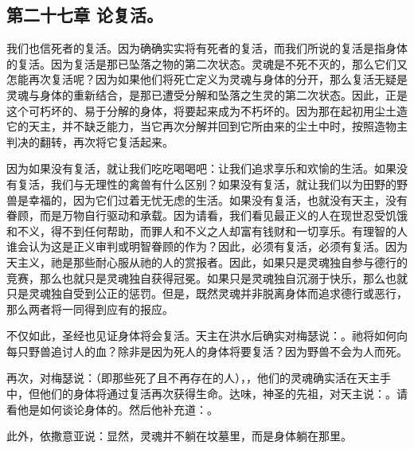 
\subsection{第二十七章 论复活。}

我们也信死者的复活。因为确确实实将有死者的复活，而我们所说的复活是指身体的复活。因为复活是那已坠落之物的第二次状态。灵魂是不死不灭的，那么它们又怎能再次复活呢？因为如果他们将死亡定义为灵魂与身体的分开，那么复活无疑是灵魂与身体的重新结合，是那已遭受分解和坠落之生灵的第二次状态。因此，正是这个可朽坏的、易于分解的身体，将要起来成为不朽坏的。因为那在起初用尘土造它的天主，并不缺乏能力，当它再次分解并回到它所由来的尘土中时，按照造物主判决的翻转，再次将它复活起来。\par

因为如果没有复活，就让我们吃吃喝喝吧：让我们追求享乐和欢愉的生活。如果没有复活，我们与无理性的禽兽有什么区别？如果没有复活，就让我们以为田野的野兽是幸福的，因为它们过着无忧无虑的生活。如果没有复活，也就没有天主，没有眷顾，而是万物自行驱动和承载。因为请看，我们看见最正义的人在现世忍受饥饿和不义，得不到任何帮助，而罪人和不义之人却富有钱财和一切享乐。有理智的人谁会认为这是正义审判或明智眷顾的作为？因此，必须有复活，必须有复活。因为天主义，祂是那些耐心服从祂的人的赏报者。因此，如果只是灵魂独自参与德行的竞赛，那么也就只是灵魂独自获得冠冕。如果只是灵魂独自沉溺于快乐，那么也就只是灵魂独自受到公正的惩罚。但是，既然灵魂并非脱离身体而追求德行或恶行，那么两者将一同得到应有的报应。\par

不仅如此，圣经也见证身体将会复活。天主在洪水后确实对梅瑟说：。祂将如何向每只野兽追讨人的血？除非是因为死人的身体将要复活？因为野兽不会为人而死。\par

再次，对梅瑟说：（即那些死了且不再存在的人），，他们的灵魂确实活在天主手中，但他们的身体将通过复活再次获得生命。达味，神圣的先祖，对天主说：。请看他是如何谈论身体的。然后他补充道：。\par

此外，依撒意亚说：显然，灵魂并不躺在坟墓里，而是身体躺在那里。\par

